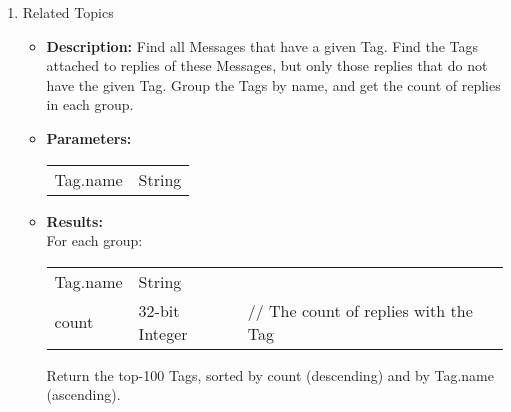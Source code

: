{\begin{enumerate}
      \item Related Topics 
            \begin{itemize}
                \item \textbf{Description:}
                  Find all Messages that have a given Tag.    
                  Find the Tags attached to replies of these Messages, but only those replies that do not have the given
                  Tag. Group the Tags by name, and get the count of replies in each group.
                \item \textbf{Parameters:} \\
                    \begin{tabular}{ll}
                      Tag.name & String \\
                    \end{tabular}
                \item \textbf{Results:} \\
                  For each group:
                    \begin{tabular}{lll}
                      Tag.name & String & \\
                      count & 32-bit Integer & \parbox[t]{20cm}{ // The count of replies with the Tag \strut} \\
                    \end{tabular}
                    Return the top-100 Tags, sorted by count (descending) and by Tag.name (ascending).
                    \end{itemize}


\end{enumerate}}
